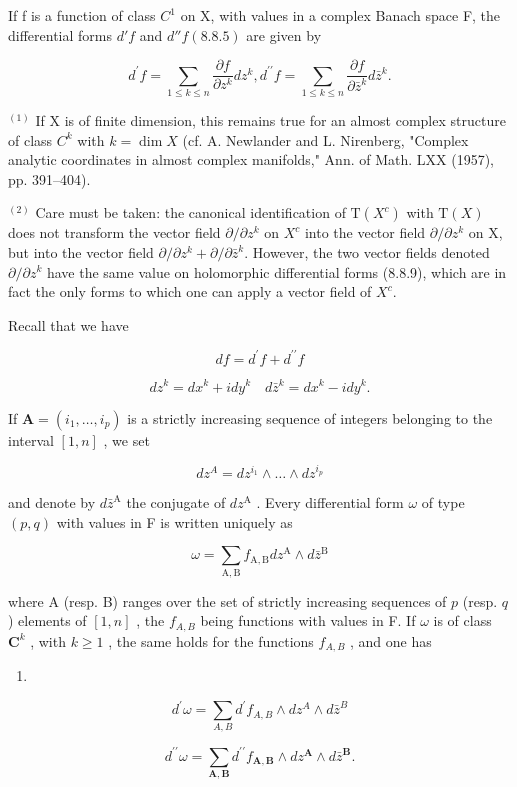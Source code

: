 If f is a function of class \(C^{1}\) on X, with values in a complex Banach space F, the differential forms \(d'f\) and \(d''f(8.8.5)\) are given by

\[
d ^ {\prime} f = \sum_ {1 \leqslant k \leqslant n} \frac {\partial f}{\partial z ^ {k}} d z ^ {k}, d ^ {\prime \prime} f = \sum_ {1 \leqslant k \leqslant n} \frac {\partial f}{\partial \bar {z} ^ {k}} d \bar {z} ^ {k}.\tag{10}
\]

\(^{(1)}\) If X is of finite dimension, this remains true for an almost complex structure of class \(C^k\) with \(k = \dim X\) (cf. A. Newlander and L. Nirenberg, "Complex analytic coordinates in almost complex manifolds," Ann. of Math. LXX (1957), pp. 391--404).

\(^{(2)}\) Care must be taken: the canonical identification of \(\mathrm{T}(X^c)\) with \(\mathrm{T}(X)\) does not transform the vector field \(\partial/\partial z^k\) on \(X^c\) into the vector field \(\partial/\partial z^k\) on X, but into the vector field \(\partial/\partial z^k+\partial/\partial\bar z^k\). However, the two vector fields denoted \(\partial/\partial z^k\) have the same value on holomorphic differential forms (8.8.9), which are in fact the only forms to which one can apply a vector field of \(X^c\).

Recall that we have

\[
d f = d ^ {\prime} f + d ^ {\prime \prime} f
\]

\[
d z ^ {k} = d x ^ {k} + i d y ^ {k} \quad d \bar {z} ^ {k} = d x ^ {k} - i d y ^ {k}.
\]

If \(\mathbf{A}=(i_{1},\ldots,i_{p})\) is a strictly increasing sequence of integers belonging to the interval \([1,n]\) , we set

\[
d z ^ {A} = d z ^ {i _ {1}} \wedge \dots \wedge d z ^ {i _ {p}}
\]

and denote by \(d\bar{z}^{\mathrm{A}}\) the conjugate of \(dz^{\mathrm{A}}\) . Every differential form \(\omega\) of type \((p,q)\) with values in F is written uniquely as

\[
\omega = \sum_ {\mathrm{A}, \mathrm{B}} f _ {\mathrm{A}, \mathrm{B}} d z ^ {\mathrm{A}} \wedge d \bar {z} ^ {\mathrm{B}}\tag{11}
\]

where A (resp. B) ranges over the set of strictly increasing sequences of \(p\) (resp. \(q\) ) elements of \([1, n]\) , the \(f_{A,B}\) being functions with values in F. If \(\omega\) is of class \(\mathbf{C}^k\) , with \(k \geqslant 1\) , the same holds for the functions \(f_{A,B}\) , and one has

\begin{enumerate}
\def\labelenumi{(\arabic{enumi})}
\setcounter{enumi}{11}
\tightlist
\item
\end{enumerate}
\[
d ^ {\prime} \omega = \sum_ {A, B} d ^ {\prime} f _ {A, B} \wedge d z ^ {A} \wedge d \bar {z} ^ {B}\tag{12}
\]

\[
d ^ {\prime \prime} \omega = \sum_ {\mathbf {A}, \mathbf {B}} d ^ {\prime \prime} f _ {\mathbf {A}, \mathbf {B}} \wedge d z ^ {\mathbf {A}} \wedge d \bar {z} ^ {\mathbf {B}}.\tag{13}
\]

